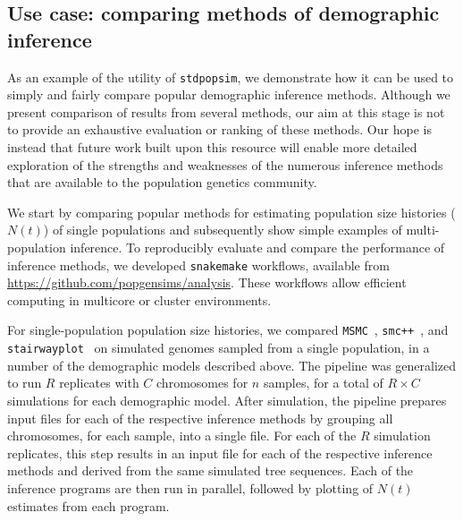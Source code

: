 \documentclass[12pt,halfline,a4paper]{ouparticle}
\newcommand{\stdpopsim}{\texttt{stdpopsim}\xspace}
\newcommand{\MSMC}{\texttt{MSMC}\xspace}
\newcommand{\smcpp}{\texttt{smc++}\xspace}
\newcommand{\stairwayplot}{\texttt{stairwayplot}\xspace}
\begin{document}
\subsection*{Use case: comparing methods of demographic inference}
As an example of the utility of \stdpopsim, we demonstrate how it can be used
to simply and fairly compare popular demographic inference methods.
Although we present comparison of results from several
methods, our aim at this stage is not to provide an exhaustive
evaluation or ranking of these methods. Our hope is instead that future work built upon this resource
will enable more detailed exploration of the strengths and weaknesses of the numerous
inference methods that are available to the population genetics community.

We start by comparing popular methods for estimating
population size histories ($N(t)$) of single populations and subsequently
show simple examples of multi-population inference.
To reproducibly evaluate and compare the performance of inference methods, we developed
\texttt{snakemake} \citep{koster2012snakemake} workflows,
available from \url{https://github.com/popgensims/analysis}.
These workflows allow efficient computing in multicore or cluster environments.

For single-population population size histories, we compared
\MSMC~\citep{schiffels2014inferring}, \smcpp~\citep{terhorst2017robust}, and
\stairwayplot~\citep{liu2015exploring}
 on simulated genomes sampled from a single population,
in a number of the demographic models described above. The pipeline was generalized to
run $R$ replicates with $C$ chromosomes for $n$ samples, for a total of $R \times C$
simulations for each demographic model. After simulation, the pipeline prepares
input files for each of the respective inference methods by grouping all
chromosomes, for each sample, into a single file. For each of the $R$ simulation replicates, this step results in an
input file for each of the
respective inference methods and derived from the same simulated tree sequences.
Each of the inference programs are then run in parallel, followed by plotting of
$N(t)$ estimates from each program.
\end{document}
